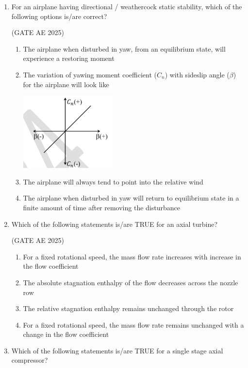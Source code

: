 \documentclass[journal,12pt,onecolumn]{IEEEtran}
\theoremstyle{remark}
\begin{document}
\begin{flushleft}
\begin{enumerate}
\item  For an airplane having directional / weathercock static stability, which of the following options is/are correct?  

\hfill (GATE AE 2025)

\begin{enumerate}
      \item The airplane when disturbed in yaw, from an equilibrium state, will experience a restoring moment  
      \item The variation of yawing moment coefficient ($C_n$) with sideslip angle ($\beta$) for the airplane will look like   
      
      \hfill\includegraphics[width=0.25\columnwidth]{figs/48.png}
      
      \item The airplane will always tend to point into the relative wind  
      \item The airplane when disturbed in yaw will return to equilibrium state in a finite amount of time after removing the disturbance  
\end{enumerate}


\item  Which of the following statements is/are TRUE for an axial turbine?  

\hfill (GATE AE 2025)

\begin{enumerate}
    \item For a fixed rotational speed, the mass flow rate increases with increase in the flow coefficient  
    \item The absolute stagnation enthalpy of the flow decreases across the nozzle row  
    \item The relative stagnation enthalpy remains unchanged through the rotor  
    \item For a fixed rotational speed, the mass flow rate remains unchanged with a change in the flow coefficient  
\end{enumerate}

\item Which of the following statements is/are TRUE for a single stage axial compressor?  


\end{enumerate}
\end{flushleft}
\end{document}
